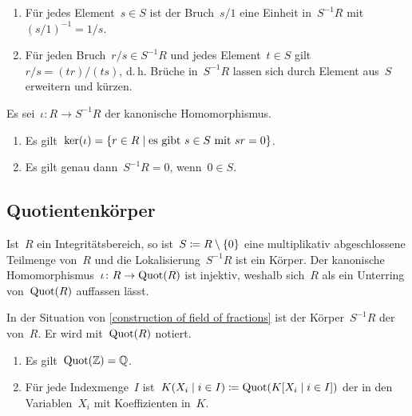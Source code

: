 \begin{proposition}
  \leavevmode
  \begin{enumerate}
    \item
      Für jedes Element~$s \in S$ ist der Bruch~$s/1$ eine Einheit in~$S^{-1} R$ mit~$(s/1)^{-1} = 1/s$.
    \item
      Für jeden Bruch~$r/s \in S^{-1} R$ und jedes Element~$t \in S$ gilt~$r/s = (tr)/(ts)$, d.\,h. Brüche in~$S^{-1} R$ lassen sich durch Element aus~$S$ erweitern und kürzen.
  \end{enumerate}
\end{proposition}

\begin{proposition}
  Es sei~$\iota \colon R \to S^{-1} R$ der kanonische Homomorphismus.
  \begin{enumerate}
    \item
      Es gilt~$\ker(\iota) = \{ r \in R \suchthat \text{es gibt~$s \in S$ mit~$sr = 0$} \}$.
    \item
      Es gilt genau dann~$S^{-1} R = 0$, wenn~$0 \in S$.
  \end{enumerate}
\end{proposition}



\subsection{Quotientenkörper}

\begin{example}
  \label{construction of field of fractions}
  Ist~$R$ ein Integritätsbereich, so ist~$S \coloneqq R \setminus \{ 0 \}$ eine multiplikativ abgeschlossene Teilmenge von~$R$ und die Lokalisierung~$S^{-1} R$ ist ein Körper.
  Der kanonische Homomorphismus~$\iota \colon R \to \Quot(R)$ ist injektiv, weshalb sich~$R$ als ein Unterring von~$\operatorname{Quot}(R)$ auffassen lässt.
\end{example}

\begin{definition}
  In der Situation von \cref{construction of field of fractions} ist der Körper~$S^{-1} R$ der  von~$R$.
  Er wird mit~$\operatorname{Quot}(R)$ notiert.
\end{definition}
 

\begin{example}
  \leavevmode
  \begin{enumerate}
    \item
      Es gilt~$\operatorname{Quot}(\mathbb{Z}) = \mathbb{Q}$.
    \item
      Für jede Indexmenge~$I$ ist~$K(X_i \suchthat i \in I) \defined \Quot( K[X_i \suchthat i \in I] )$ der  in den Variablen~$X_i$ mit Koeffizienten in~$K$.
  \end{enumerate}
\end{example}

